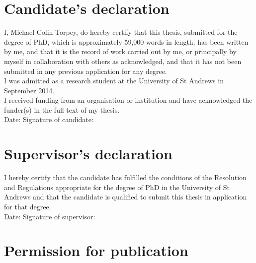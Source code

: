 

\vspace{-1.3em}
\section*{Candidate's declaration}

\noindent
I, Michael Colin Torpey, do hereby certify that this thesis, submitted for the
degree of PhD, which is approximately
59,000
words in length, has been written by me, and that it is the record of work
carried out by me, or principally by myself in collaboration with others as
acknowledged, and that it has not been submitted in any previous application for
any degree.
\\

\noindent
I was admitted as a research student at the University of St Andrews in
September 2014.
\\

\noindent
I received funding from an organisation or institution and have acknowledged the
funder(s) in the full text of my thesis.
\\

\vspace{1.0em}
\noindent
Date:\makebox[7em]{\dotfill}
Signature of candidate:\dotfill
\\

\vspace{-1.3em}
\section*{Supervisor's declaration}

\noindent
I hereby certify that the candidate has fulfilled the conditions of the
Resolution and Regulations appropriate for the degree of PhD in the University
of St Andrews and that the candidate is qualified to submit this thesis in
application for that degree.
\\

\vspace{1.0em}
\noindent
Date:\makebox[7em]{\dotfill}
Signature of supervisor:\dotfill
\\

\vspace{-1.3em}
\section*{Permission for publication}

